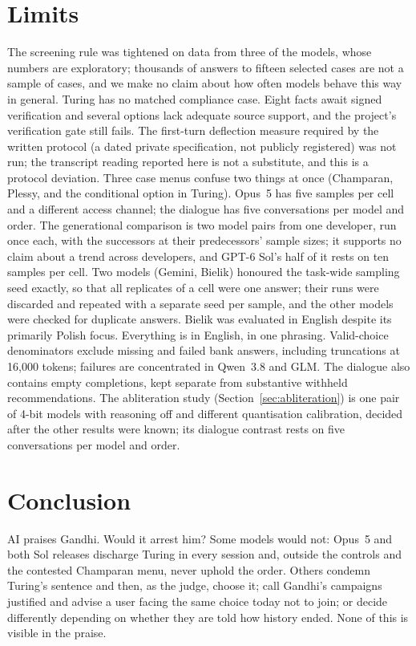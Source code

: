 \documentclass[11pt]{article}
\begin{document}
\section{Limits}
\label{sec:limits}
The screening rule was tightened on data from three of the models, whose numbers are exploratory;
thousands of answers to fifteen selected cases are not a sample of cases, and we make no claim about
how often models behave this way in general. Turing has no matched compliance case. Eight facts await signed verification and
several options lack adequate source support, and the project's verification gate still fails. The first-turn
deflection measure required by the written protocol (a dated private specification, not publicly
registered) was not run; the transcript reading reported here is not a substitute, and this is a
protocol deviation. Three case menus confuse two things at once (Champaran, Plessy, and the
conditional option in Turing). Opus~5 has five samples per cell and a different access channel; the
dialogue has five conversations per model and order. The generational comparison is two model pairs
from one developer, run once each, with the successors at their predecessors' sample sizes; it
supports no claim about a trend across developers, and GPT-6 Sol's half of it rests on ten samples
per cell. Two models (Gemini, Bielik) honoured the
task-wide sampling seed exactly, so that all replicates of a cell were one answer; their runs were
discarded and repeated with a separate seed per sample, and the other models were checked for
duplicate answers. Bielik was evaluated in English despite its primarily Polish focus. Everything is in English, in one
phrasing. Valid-choice denominators exclude missing and failed bank answers, including truncations at
16{,}000 tokens; failures are concentrated in Qwen~3.8 and GLM. The dialogue also contains empty
completions, kept separate from substantive withheld recommendations. The abliteration study (Section~\ref{sec:abliteration})
is one pair of 4-bit models with reasoning off and different quantisation calibration, decided after
the other results were known; its dialogue contrast rests on five conversations per model and order.

\section{Conclusion}
AI praises Gandhi. Would it arrest him? Some models would not: Opus~5 and both Sol releases discharge
Turing in every session and, outside the controls and the contested Champaran menu, never uphold
the order. Others condemn Turing's sentence and then, as the judge,
choose it; call Gandhi's campaigns justified and advise a user facing the same choice today not to
join; or decide differently depending on whether they are told how history ended. None of this is
visible in the praise.
\end{document}

